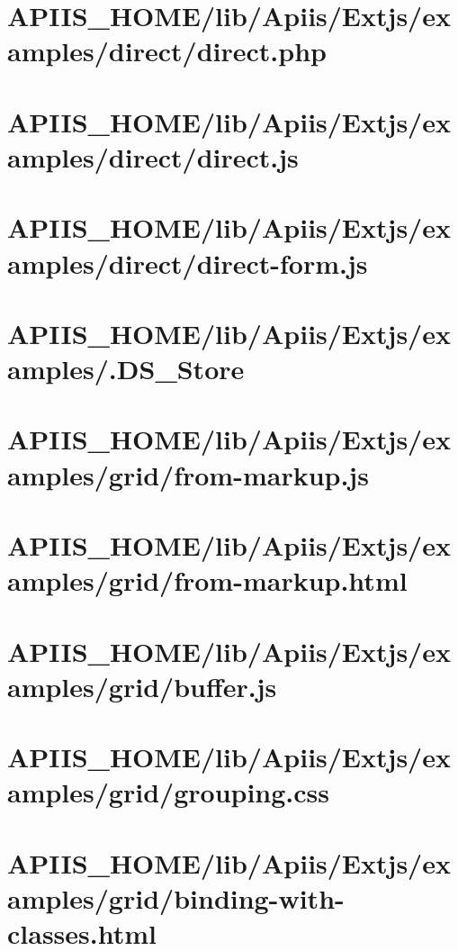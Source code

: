 \section{APIIS\_HOME/lib/Apiis/Extjs/examples/direct/direct.php} 
\section{APIIS\_HOME/lib/Apiis/Extjs/examples/direct/direct.js} 
\section{APIIS\_HOME/lib/Apiis/Extjs/examples/direct/direct-form.js} 
\section{APIIS\_HOME/lib/Apiis/Extjs/examples/.DS\_Store} 
\section{APIIS\_HOME/lib/Apiis/Extjs/examples/grid/from-markup.js} 
\section{APIIS\_HOME/lib/Apiis/Extjs/examples/grid/from-markup.html} 
\section{APIIS\_HOME/lib/Apiis/Extjs/examples/grid/buffer.js} 
\section{APIIS\_HOME/lib/Apiis/Extjs/examples/grid/grouping.css} 
\section{APIIS\_HOME/lib/Apiis/Extjs/examples/grid/binding-with-classes.html} 
